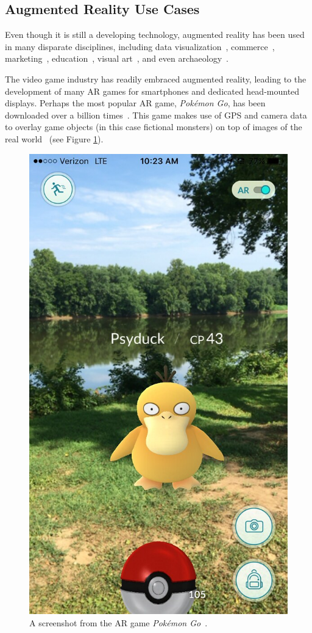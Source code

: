 \documentclass[a4paper, 10pt, american, titlepage]{article}
\begin{document}
\subsection{Augmented Reality Use Cases}
\label{sec:augmentedRealityUseCases}

Even though it is still a developing technology, augmented reality has been used
in many disparate disciplines, including data
visualization~\autocite{resnick2017}, commerce~\autocite{matney2018},
marketing~\autocite{sharma2015}, education~\autocite{stewart-smith2012}, visual
art~\autocite{katz2018}, and even archaeology~\autocite{eve2012}.

The video game industry has readily embraced augmented reality, leading to the
development of many AR games for smartphones and dedicated head-mounted
displays. Perhaps the most popular AR game, \textit{Pokémon Go}, has been
downloaded over a billion times~\autocite{webster2018}. This game makes use of
GPS and camera data to overlay game objects (in this case fictional monsters) on
top of images of the real world~\autocite{concepcion2016} (see Figure
\ref{fig:pokemonGo}).

\begin{figure}[h]
	\centering
	\includegraphics[width=.5\textwidth]{pokemon-go.jpg}
	\caption[A screenshot from the AR game \textit{Pokémon Go}]{A screenshot
		from the AR game \textit{Pokémon Go}~\autocite{vastateparks2016}.}
	\label{fig:pokemonGo}
\end{figure}
\end{document}
